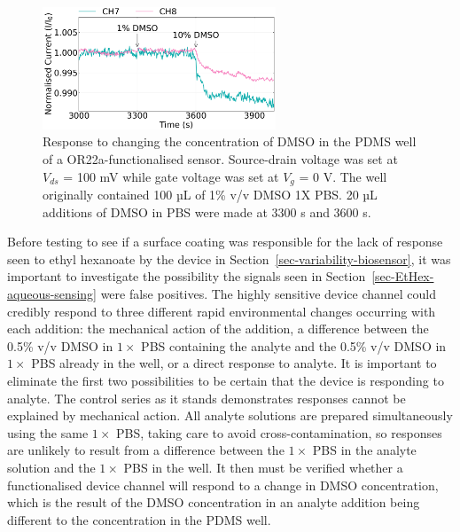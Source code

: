 \documentclass[
  a4paper,
]{scrbook}
\begin{document}
\begin{figure}

{\centering \includegraphics[width=0.62\textwidth,height=\textheight]{figures/ch7/NGW4_D7_OR22aliposome_sampling_220623_detrend_trunc_arrows_normalised.png}

}

\caption[Response to changing the concentration of DMSO in the PDMS well
of a OR22a-functionalised
sensor.]{\label{fig-DMSO-concentration}Response to changing the
concentration of DMSO in the PDMS well of a OR22a-functionalised sensor.
Source-drain voltage was set at \(V_{ds}\) = 100 mV while gate voltage
was set at \(V_g\) = 0 V. The well originally contained 100 µL of 1\%
v/v DMSO 1X PBS. 20 µL additions of DMSO in PBS were made at 3300 s and
3600 s.}

\end{figure}

Before testing to see if a surface coating was responsible for the lack
of response seen to ethyl hexanoate by the device in
Section~\ref{sec-variability-biosensor}, it was important to investigate
the possibility the signals seen in
Section~\ref{sec-EtHex-aqueous-sensing} were false positives. The highly
sensitive device channel could credibly respond to three different rapid
environmental changes occurring with each addition: the mechanical
action of the addition, a difference between the 0.5\% v/v DMSO in
\(1 \times\) PBS containing the analyte and the 0.5\% v/v DMSO in
\(1 \times\) PBS already in the well, or a direct response to analyte.
It is important to eliminate the first two possibilities to be certain
that the device is responding to analyte. The control series as it
stands demonstrates responses cannot be explained by mechanical action.
All analyte solutions are prepared simultaneously using the same
\(1 \times\) PBS, taking care to avoid cross-contamination, so responses
are unlikely to result from a difference between the \(1 \times\) PBS in
the analyte solution and the \(1 \times\) PBS in the well. It then must
be verified whether a functionalised device channel will respond to a
change in DMSO concentration, which is the result of the DMSO
concentration in an analyte addition being different to the
concentration in the PDMS well.
\end{document}
